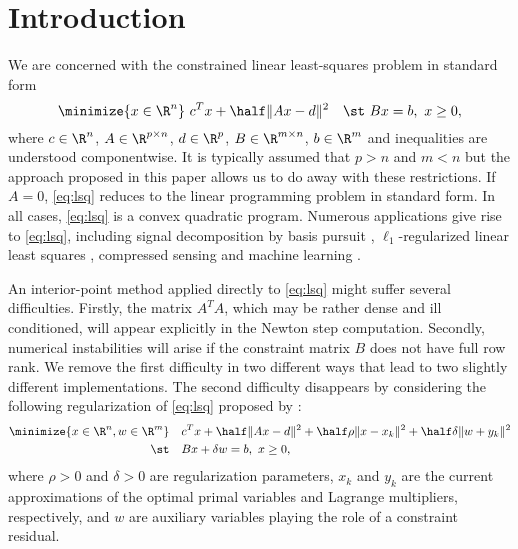 \documentclass{amsart}
\begin{document}
\section{Introduction}

We are concerned with the constrained linear least-squares problem in standard
form
\begin{equation}
  \label{eq:lsq}
  \minimize{x \in \R^n} \ c^T x + \half \|Ax - d\|^2 \quad
  \st \ Bx = b, \ x \geq 0,
\end{equation}
where $c \in \R^n$, $A \in \R^{p \times n}$, $d \in \R^p$, $B \in \R^{m \times
n}$, $b \in \R^m$ and inequalities are understood componentwise. It is
typically assumed that $p > n$ and $m < n$ but the approach proposed in this
paper allows us to do away with these restrictions. If $A = 0$, \eqref{eq:lsq}
reduces to the linear programming problem in standard form. In all cases,
\eqref{eq:lsq} is a convex quadratic program. Numerous applications give rise
to \eqref{eq:lsq}, including signal decomposition by basis pursuit
\citep{chen-donoho-saunders-1998}, $\ell_1$-regularized linear least squares
\citep{kim-koh-lustig-boyd-gorinevsky-2007}, compressed sensing
\citep{donoho-2006} and machine learning \citep{koh-kim-boyd-2007}.

An interior-point method applied directly to \eqref{eq:lsq} might suffer
several difficulties. Firstly, the matrix $A^T \! A$, which may be rather
dense and ill conditioned, will appear explicitly in the Newton step
computation. Secondly, numerical instabilities will arise if the constraint
matrix $B$ does not have full row rank. We remove the first difficulty in two
different ways that lead to two slightly different implementations. The second
difficulty disappears by considering the following regularization of
\eqref{eq:lsq} proposed by \cite{friedlander-orban-2012}:
\begin{equation}
  \begin{aligned}
  \label{eq:lsq-reg}
    \minimize{x \in \R^n, w \in \R^m} \quad &
                              c^T x + \half \|Ax - d\|^2 +
                              \half \rho \|x - x_k\|^2 +
                              \half \delta \|w + y_k\|^2 \\
    \st \quad & B x + \delta w = b, \ x \geq 0,
  \end{aligned}
\end{equation}
where $\rho > 0$ and $\delta > 0$ are regularization parameters, $x_k$ and
$y_k$ are the current approximations of the optimal primal variables and
Lagrange multipliers, respectively, and $w$ are auxiliary variables playing
the role of a constraint residual.
\end{document}

